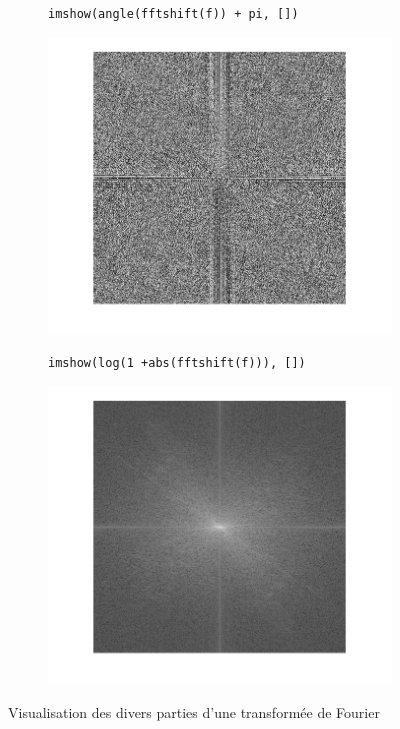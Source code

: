\documentclass[12pt,a4paper,onecolumn]{article}
\begin{document}
\begin{figure}
\begin{subfigure}[b]{0.45\textwidth}
		\label{7_42}
	\end{subfigure}
	\begin{subfigure}[b]{0.45\textwidth}
		\centering
		\begin{lstlisting}[frame = none, numbers = none]
imshow(angle(fftshift(f)) + pi, [])
		\end{lstlisting}
		\includegraphics[scale = 1, width = \textwidth]{7_43}
		\label{7_43}
	\end{subfigure}
	\begin{subfigure}[b]{0.45\textwidth}
		\centering
		\begin{lstlisting}[frame = none, numbers = none]
imshow(log(1 +abs(fftshift(f))), [])
		\end{lstlisting}
		\includegraphics[scale = 1, width = \textwidth]{7_44}
		\label{7_44}
	\end{subfigure}
	\caption{Visualisation des divers parties d'une transformée de Fourier}
	\label{}
\end{figure}
\end{document}
